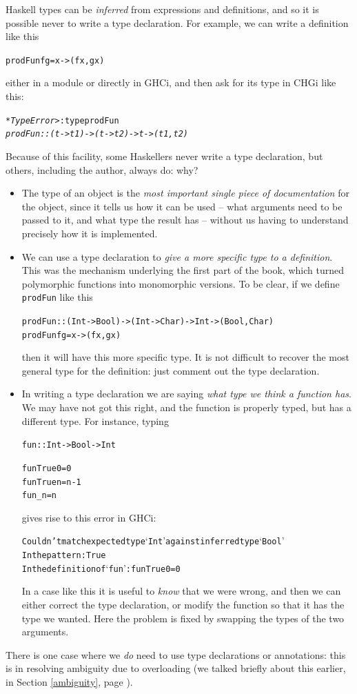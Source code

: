 Haskell types can be \emph{inferred} from expressions and definitions, and so it is possible never to write a type declaration. For example, we can write a definition like this
\begin{alltt}
prodFun f g = \bs{}x -> (f x, g x)
\end{alltt}
either in a module or directly in GHCi, and then ask for its type in CHGi like this:
\begin{alltt}
\textsl{*TypeError>} :type prodFun
\textsl{prodFun :: (t -> t1) -> (t -> t2) -> t -> (t1,t2)}
\end{alltt}
Because of this facility, some Haskellers never write a type declaration, but others, including the author, always do: why?
\begin{itemize}
\item
The type of an object is the \emph{most important single piece of documentation} for the object, since it tells us how it can be used -- what arguments need to be passed to it, and what type the result has -- without us having to understand precisely how it is implemented.
\item
We can use a type declaration to \emph{give a more specific type to a definition}. This was the mechanism underlying the first part of the book, which turned polymorphic functions into monomorphic versions. To be clear, if we define \texttt{prodFun} like this
\begin{alltt}
prodFun :: (Int -> Bool) -> (Int -> Char) -> Int -> (Bool,Char)
prodFun f g = \bs{}x -> (f x, g x)
\end{alltt}
then it will have this more specific type. It is not difficult to recover the most general type for the definition: just comment out the type declaration.
\item
In writing a type declaration we are saying \emph{what type we think a function has}. We may have not got this right, and the function is properly typed, but has a different type. For instance, typing
\begin{alltt}
fun :: Int -> Bool -> Int

fun True 0 = 0
fun True n = n-1
fun _ n    = n\end{alltt}
gives rise to this error in GHCi:
\begin{alltt}
    Couldn't match expected type `Int' against inferred type `Bool'
    In the pattern: True
    In the definition of `fun': fun True 0 = 0
\end{alltt}
In a case like this it is useful to \emph{know} that we were wrong, and then we can either correct the type declaration, or modify the function so that it has the type we wanted. Here the problem is fixed by swapping the types of the two arguments.
\end{itemize}
There is one case where we \emph{do} need to use type declarations or annotations: this is in resolving ambiguity due to overloading (we talked briefly about this earlier, in Section \ref{ambiguity}, page \pageref{ambiguity}).

